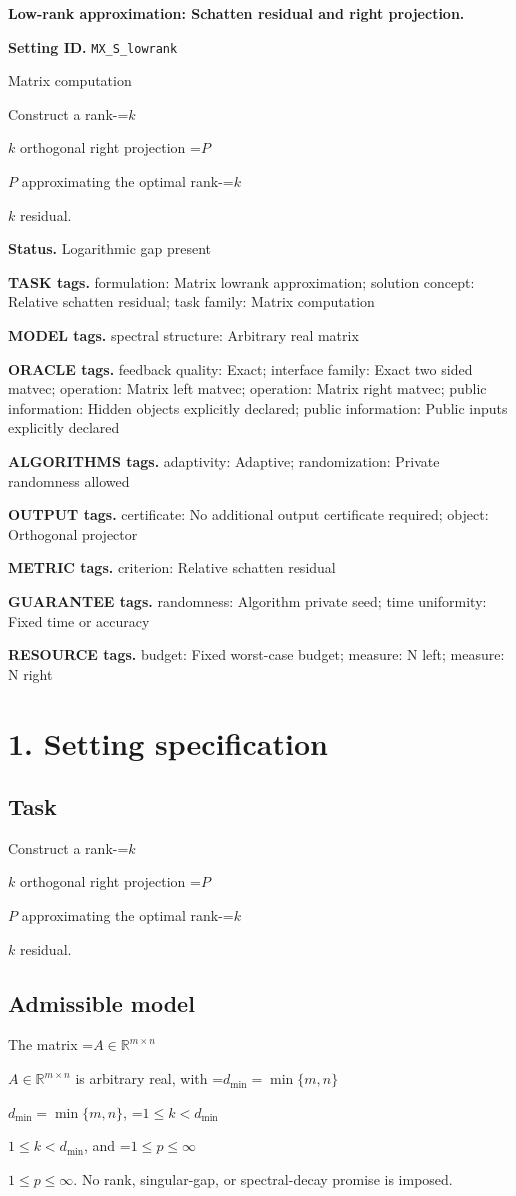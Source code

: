 \documentclass[10pt,a4paper]{article}
\newcommand{\AtlasMath}[1]{\par\begingroup\centering\setbox0=\hbox{$\displaystyle #1$}\ifdim\wd0>1.4\linewidth\typeout{ATLAS WIDE FORMULA: \the\wd0}\fi\ifdim\wd0>\linewidth\resizebox{\linewidth}{!}{\box0}\else\box0\fi\par\endgroup}
\newcommand{\AtlasInlineMath}[1]{\begingroup\setbox0=\hbox{$#1$}\ifdim\wd0>.4\linewidth\endgroup\AtlasMath{#1}\else\endgroup$#1$\fi}
\begin{document}
\raggedright

{\LARGE\bfseries\sffamily\color{AtlasNavy} Low-rank approximation: Schatten residual and right projection.\par}\vspace{5pt}
\textbf{Setting ID.} \texttt{MX\_\allowbreak{}S\_\allowbreak{}lowrank}

Matrix computation

Construct a rank-\AtlasInlineMath{k} orthogonal right projection \AtlasInlineMath{P} approximating the optimal rank-\AtlasInlineMath{k} residual.

\textbf{Status.} Logarithmic gap present

\textbf{TASK tags.} formulation: Matrix lowrank approximation; solution concept: Relative schatten residual; task family: Matrix computation

\textbf{MODEL tags.} spectral structure: Arbitrary real matrix

\textbf{ORACLE tags.} feedback quality: Exact; interface family: Exact two sided matvec; operation: Matrix left matvec; operation: Matrix right matvec; public information: Hidden objects explicitly declared; public information: Public inputs explicitly declared

\textbf{ALGORITHMS tags.} adaptivity: Adaptive; randomization: Private randomness allowed

\textbf{OUTPUT tags.} certificate: No additional output certificate required; object: Orthogonal projector

\textbf{METRIC tags.} criterion: Relative schatten residual

\textbf{GUARANTEE tags.} randomness: Algorithm private seed; time uniformity: Fixed time or accuracy

\textbf{RESOURCE tags.} budget: Fixed worst-case budget; measure: N left; measure: N right

\section{1. Setting specification}
\subsection{Task}
Construct a rank-\AtlasInlineMath{k} orthogonal right projection \AtlasInlineMath{P} approximating the optimal rank-\AtlasInlineMath{k} residual.

\subsection{Admissible model}
The matrix \AtlasInlineMath{A\in\mathbb{R}^{m\times n}} is arbitrary real, with \AtlasInlineMath{d_{\mathrm{min}}=\min\{m,n\}}, \AtlasInlineMath{1\le k<d_{\mathrm{min}}}, and \AtlasInlineMath{1\le p\le\infty}. No rank, singular-gap, or spectral-decay promise is imposed.
\end{document}
